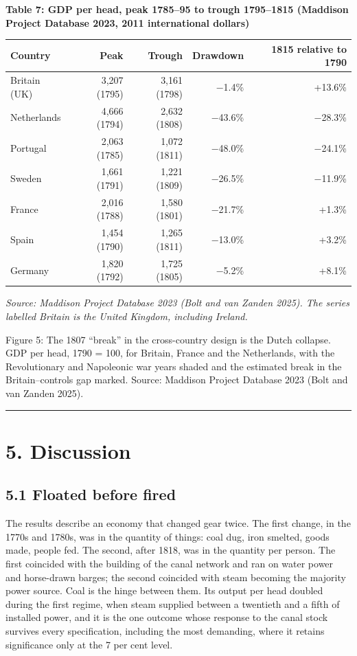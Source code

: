 \documentclass[
  11pt,
]{article}
\newcounter{none} %
\begin{document}
\textbf{Table 7: GDP per head, peak 1785--95 to trough 1795--1815
(Maddison Project Database 2023, 2011 international dollars)}

{\def\LTcaptype{none} %
\begin{longtable}[]{@{}lrrrr@{}}
\toprule\noalign{}
Country & Peak & Trough & Drawdown & 1815 relative to 1790 \\
\midrule\noalign{}
\endhead
\bottomrule\noalign{}
\endlastfoot
Britain (UK) & 3,207 (1795) & 3,161 (1798) & −1.4\% & +13.6\% \\
Netherlands & 4,666 (1794) & 2,632 (1808) & −43.6\% & −28.3\% \\
Portugal & 2,063 (1785) & 1,072 (1811) & −48.0\% & −24.1\% \\
Sweden & 1,661 (1791) & 1,221 (1809) & −26.5\% & −11.9\% \\
France & 2,016 (1788) & 1,580 (1801) & −21.7\% & +1.3\% \\
Spain & 1,454 (1790) & 1,265 (1811) & −13.0\% & +3.2\% \\
Germany & 1,820 (1792) & 1,725 (1805) & −5.2\% & +8.1\% \\
\end{longtable}
}

\emph{Source: Maddison Project Database 2023 (Bolt and van Zanden 2025).
The series labelled Britain is the United Kingdom, including Ireland.}

Figure 5: The 1807 ``break'' in the cross-country design is the Dutch
collapse. GDP per head, 1790 = 100, for Britain, France and the
Netherlands, with the Revolutionary and Napoleonic war years shaded and
the estimated break in the Britain--controls gap marked. Source:
Maddison Project Database 2023 (Bolt and van Zanden 2025).

\begin{center}\rule{0.5\linewidth}{0.5pt}\end{center}

\section{5. Discussion}\label{discussion}

\subsection{5.1 Floated before fired}\label{floated-before-fired}

The results describe an economy that changed gear twice. The first
change, in the 1770s and 1780s, was in the quantity of things: coal dug,
iron smelted, goods made, people fed. The second, after 1818, was in the
quantity per person. The first coincided with the building of the canal
network and ran on water power and horse-drawn barges; the second
coincided with steam becoming the majority power source. Coal is the
hinge between them. Its output per head doubled during the first regime,
when steam supplied between a twentieth and a fifth of installed power,
and it is the one outcome whose response to the canal stock survives
every specification, including the most demanding, where it retains
significance only at the 7 per cent level.
\end{document}
